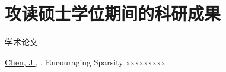 \chapter{攻读硕士学位期间的科研成果}



\begin{enumerate}[label = {[\arabic*]}]
    \item[] {\heiti 学术论文}
    \item \underline{Chen, J.}, . Encouraging Sparsity xxxxxxxxx
\end{enumerate}
